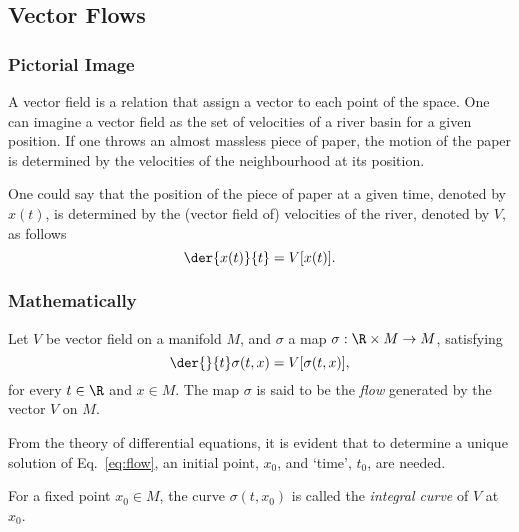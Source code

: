 \subsection{Vector Flows}

\subsubsection*{Pictorial Image}

A vector field is a relation that assign a vector to each point of the space. One can imagine a vector field as the set of velocities of a river basin for a given position. If one throws an almost massless piece of paper, the motion of the paper is determined by the velocities of the neighbourhood at its position.

One could say that the position of the piece of paper at a given time, denoted by $x(t)$, is determined by the (vector field of) velocities of the river, denoted by $V$, as follows
\begin{equation}
  \der{x(t)}{t} = V[x(t)].
\end{equation}

\subsubsection*{Mathematically}

Let $V$ be  vector field  on a manifold $M$, and $\sigma$ a map  \mbox{$\sigma:\R\times M\to M$}, satisfying
\begin{equation}
  \der{}{t}\sigma(t,x) = V[\sigma(t,x)],
  \label{eq:flow}
\end{equation}
for every $t\in \R$ and $x\in M$. The map $\sigma$ is said to be the \emph{flow} generated by the vector $V$ on $M$.

From the theory of differential equations, it is evident that to determine a unique solution of Eq.~\eqref{eq:flow}, an initial point, $x_0$, and `time', $t_0$, are needed.

For a fixed point $x_0\in M$, the curve $\sigma(t,x_0)$ is called the \emph{integral curve}
of $V$ at $x_0$.


